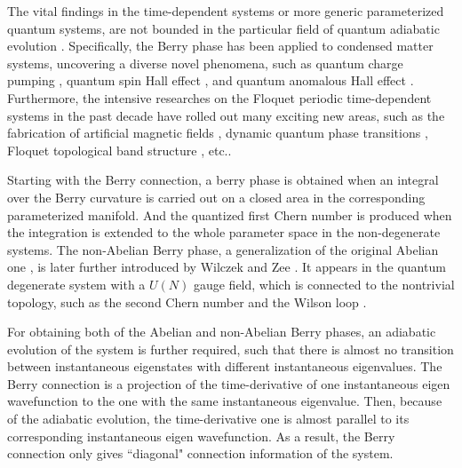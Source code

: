 \documentclass[aps,pra,twocolumn,
groupedaddress,10pt]{revtex4}
\begin{document}
The vital findings in the time-dependent systems
or more generic parameterized quantum systems, are not bounded in the particular
field of quantum adiabatic evolution \cite{Xiao2010, eckardt2017colloquium}.
Specifically, the Berry phase has been applied to
condensed matter systems, uncovering a diverse novel
phenomena, such as quantum charge pumping \cite{niu1990towards,PhysRevB.27.6083},
quantum spin Hall effect \cite{murakami2003,murakami20042,guo2008intrinsic},
and quantum anomalous Hall effect \cite{PhysRevLett.61.2015} . Furthermore,
the intensive researches on the Floquet periodic time-dependent systems in the past decade
have rolled out many exciting new areas, such as the fabrication of
artificial magnetic fields \cite{Aidelsburger2011}, dynamic quantum phase transitions \cite{Heyl2015},
Floquet topological band structure \cite{Jotzu2014}, etc..

Starting with the Berry connection, a berry phase is obtained
when an integral over the Berry curvature is carried out on a closed area in the
corresponding parameterized manifold. And the quantized first Chern
number is produced when the integration is extended to the whole
parameter space in the non-degenerate systems.
The non-Abelian Berry phase, a generalization of the original
Abelian one \cite{berry1984proc}, is later further introduced by
Wilczek and Zee \cite{wilczek1984appearance}.  It appears
in the quantum degenerate system with a $U(N)$ gauge field,
which is connected to the nontrivial topology, such as
the second Chern number and the Wilson loop \cite{PhysRevD.10.2445}.

For obtaining both of the Abelian and non-Abelian Berry phases,
an adiabatic evolution of the system is further required,
such that there is almost no transition
between instantaneous eigenstates with different instantaneous eigenvalues.
The Berry connection is a projection of the time-derivative of one instantaneous
eigen wavefunction to the one with the same instantaneous
eigenvalue. Then, because of the adiabatic evolution, the time-derivative one is almost
parallel to its corresponding instantaneous eigen wavefunction.
As a result, the Berry connection only
gives ``diagonal" connection information of the system.
\end{document}

